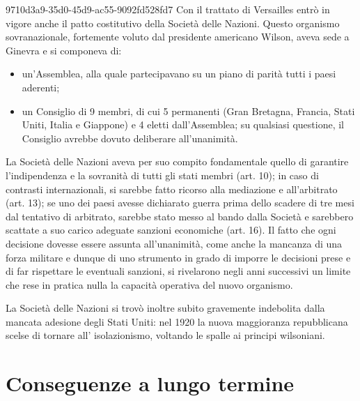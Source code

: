 \documentclass[preview]{standalone}
\begin{document}
\begin{snippet}{9710d3a9-35d0-45d9-ac55-9092fd528fd7}
    Con il trattato di Versailles entrò in vigore anche il patto costitutivo della Società delle Nazioni.
    Questo organismo sovranazionale, fortemente voluto dal presidente americano Wilson, aveva
    sede a Ginevra e si componeva di:
    \begin{itemize}
        \item un'Assemblea, alla quale partecipavano su un piano di parità tutti i paesi aderenti;
        \item un Consiglio di 9 membri, di cui 5 permanenti (Gran Bretagna, Francia, Stati Uniti, Italia
            e Giappone) e 4 eletti dall'Assemblea; su qualsiasi questione, il Consiglio avrebbe dovuto
            deliberare all'unanimità.
    \end{itemize}
    
    La Società delle Nazioni aveva per suo compito fondamentale quello di garantire l'indipendenza
    e la sovranità di tutti gli stati membri (art. 10); in caso di contrasti internazionali, si sarebbe
    fatto ricorso alla mediazione e all'arbitrato (art. 13); se uno dei paesi avesse dichiarato guerra
    prima dello scadere di tre mesi dal tentativo di arbitrato, sarebbe stato messo al bando dalla
    Società e sarebbero scattate a suo carico adeguate sanzioni economiche (art. 16).
    Il fatto che ogni decisione dovesse essere assunta all'unanimità, come anche la mancanza di una
    forza militare e dunque di uno strumento in grado di imporre le decisioni prese e di far
    rispettare le eventuali sanzioni, si rivelarono negli anni successivi un limite che rese in pratica
    nulla la capacità operativa del nuovo organismo.
    
    La Società delle Nazioni si trovò inoltre subito gravemente indebolita dalla mancata adesione
    degli Stati Uniti: nel 1920 la nuova maggioranza repubblicana scelse di tornare all'
    isolazionismo, voltando le spalle ai principi wilsoniani.
\end{snippet}

\section{Conseguenze a lungo termine}
\end{document}
